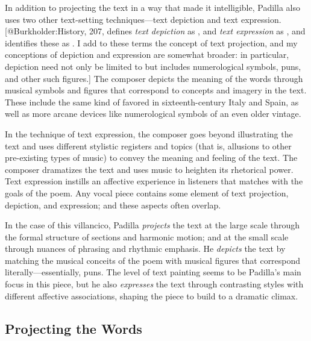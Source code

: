 In addition to projecting the text in a way that made it intelligible, Padilla
also uses two other text-setting techniques---text depiction and text
expression.
[@Burkholder:History, 207, defines \emph{text depiction} as , and \emph{text expression} as , and identifies
these as .
I add to these terms the concept of text projection, and my conceptions of
depiction and expression are somewhat broader: in particular, depiction need not
only be limited to  but includes numerological symbols, puns, and
other such figures.]
The composer depicts the meaning of the words through musical symbols and
figures that correspond to concepts and imagery in the text.
These include the same kind of  favored in sixteenth-century Italy
and Spain, as well as more arcane devices like numerological symbols of an even
older vintage.

In the technique of text expression, the composer goes beyond illustrating the
text and uses different stylistic registers and topics (that is, allusions to
other pre-existing types of music) to convey the meaning and feeling of the
text.
The composer dramatizes the text and uses music to heighten its rhetorical
power.
Text expression instills an affective experience in listeners that matches with
the goals of the poem.
Any vocal piece contains some element of text projection, depiction, and
expression; and these aspects often overlap.

In the case of this villancico, Padilla \emph{projects} the text at the large 
scale through the formal structure of sections and harmonic motion; and
at the small scale through nuances of phrasing and rhythmic emphasis.
He \emph{depicts} the text by matching the musical conceits of the poem with
musical figures that correspond literally---essentially, puns.
The level of text painting seems to be Padilla's main focus in this piece, but
he also \emph{expresses} the text through contrasting styles with different affective
associations, shaping the piece to build to a dramatic climax.

\subsection{Projecting the Words}

